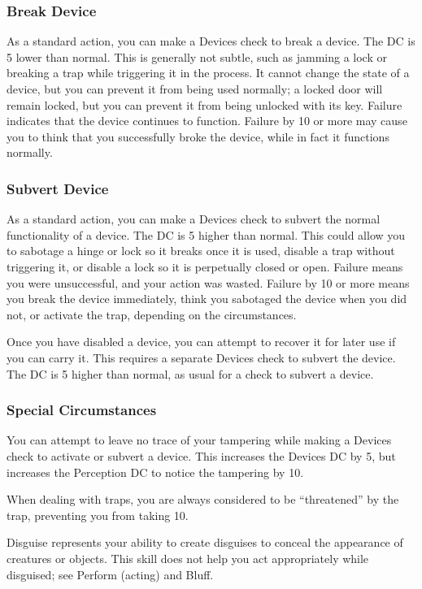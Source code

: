 \subsubsection{Break Device}
As a standard action, you can make a Devices check to break a device. The DC is 5 lower than normal. This is generally not subtle, such as jamming a lock or breaking a trap while triggering it in the process. It cannot change the state of a device, but you can prevent it from being used normally; a locked door will remain locked, but you can prevent it from being unlocked with its key. Failure indicates that the device continues to function. Failure by 10 or more may cause you to think that you successfully broke the device, while in fact it functions normally.

\subsubsection{Subvert Device}
As a standard action, you can make a Devices check to subvert the normal functionality of a device. The DC is 5 higher than normal. This could allow you to sabotage a hinge or lock so it breaks once it is used, disable a trap without triggering it, or disable a lock so it is perpetually closed or open. Failure means you were unsuccessful, and your action was wasted. Failure by 10 or more means you break the device immediately, think you sabotaged the device when you did not, or activate the trap, depending on the circumstances.

Once you have disabled a device, you can attempt to recover it for later use if you can carry it. This requires a separate Devices check to subvert the device. The DC is 5 higher than normal, as usual for a check to subvert a device.

\subsubsection{Special Circumstances}

You can attempt to leave no trace of your tampering while making a Devices check to activate or subvert a device. This increases the Devices DC by 5, but increases the Perception DC to notice the tampering by 10.

When dealing with traps, you are always considered to be ``threatened'' by the trap, preventing you from taking 10.

Disguise represents your ability to create disguises to conceal the appearance of creatures or objects. This skill does not help you act appropriately while disguised; see Perform (acting) and Bluff.

